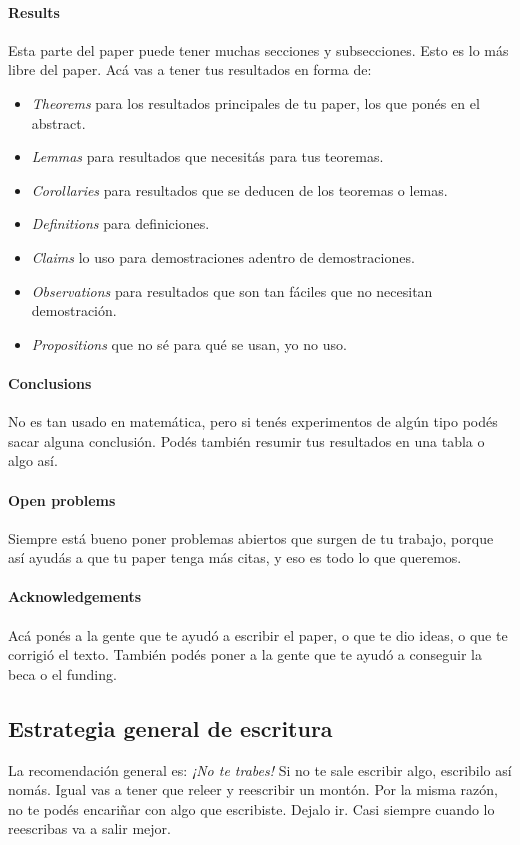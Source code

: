 \documentclass{article}
\begin{document}
\paragraph{Results} Esta parte del paper puede tener muchas secciones y subsecciones. Esto es lo más libre del paper. Acá vas a tener tus resultados en forma de:
\begin{itemize}
    \item\emph{Theorems} para los resultados principales de tu paper, los que ponés en el abstract.
    \item\emph{Lemmas} para resultados que necesitás para tus teoremas.
    \item\emph{Corollaries} para resultados que se deducen de los teoremas o lemas.
    \item\emph{Definitions} para definiciones.
    \item\emph{Claims} lo uso para demostraciones adentro de demostraciones.
    \item\emph{Observations} para resultados que son tan fáciles que no necesitan demostración.
    \item\emph{Propositions} que no sé para qué se usan, yo no uso.
\end{itemize}

\paragraph{Conclusions} No es tan usado en matemática, pero si tenés experimentos de algún tipo podés sacar alguna conclusión. Podés también resumir tus resultados en una tabla o algo así.

\paragraph{Open problems} Siempre está bueno poner problemas abiertos que surgen de tu trabajo, porque así ayudás a que tu paper tenga más citas, y eso es todo lo que queremos.

\paragraph{Acknowledgements} Acá ponés a la gente que te ayudó a escribir el paper, o que te dio ideas, o que te corrigió el texto. También podés poner a la gente que te ayudó a conseguir la beca o el funding.
\subsection{Estrategia general de escritura}
La recomendación general es: \emph{¡No te trabes!} Si no te sale escribir algo, escribilo así nomás. Igual vas a tener que releer y reescribir un montón. Por la misma razón, no te podés encariñar con algo que escribiste. Dejalo ir. Casi siempre cuando lo reescribas va a salir mejor.
\end{document}
